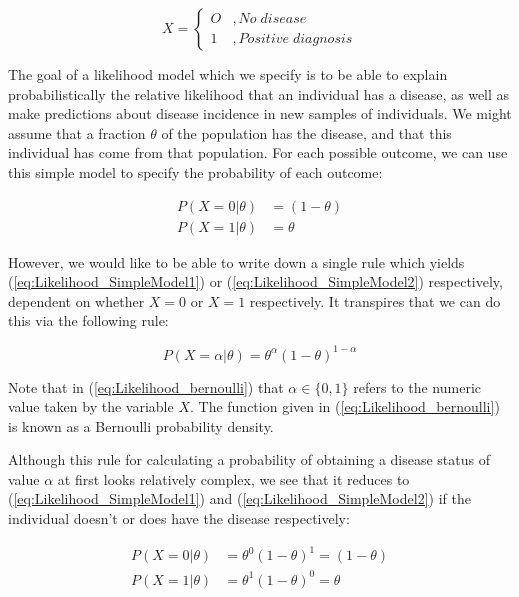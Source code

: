 \documentclass[11pt,fullpage]{book}
\begin{document}
\begin{equation}
X =
\begin{cases}
O & , No\; disease \\
1 & , Positive \; diagnosis
\end{cases}
\end{equation}

The goal of a likelihood model which we specify is to be able to explain probabilistically the relative likelihood that an individual has a disease, as well as make predictions about disease incidence in new samples of individuals. We might assume that a fraction $\theta$ of the population has the disease, and that this individual has come from that population. For each possible outcome, we can use this simple model to specify the probability of each outcome:

\begin{align}\label{eq:Likelihood_SimpleModel1}
P(X = 0|\theta)& = (1-\theta)\\
P(X = 1|\theta)& = \theta\label{eq:Likelihood_SimpleModel2}
\end{align}

However, we would like to be able to write down a single rule which yields (\ref{eq:Likelihood_SimpleModel1}) or (\ref{eq:Likelihood_SimpleModel2}) respectively, dependent on whether $X=0$ or $X=1$ respectively. It transpires that we can do this via the following rule:

\begin{equation}
P(X=\alpha|\theta) = \theta^\alpha(1-\theta)^{1-\alpha}
\end{equation}\label{eq:Likelihood_bernoulli}

Note that in (\ref{eq:Likelihood_bernoulli}) that $\alpha\in\{0,1\}$ refers to the numeric value taken by the variable $X$. The function given in (\ref{eq:Likelihood_bernoulli}) is known as a Bernoulli probability density.

Although this rule for calculating a probability of obtaining a disease status of value $\alpha$ at first looks relatively complex, we see that it reduces to (\ref{eq:Likelihood_SimpleModel1}) and (\ref{eq:Likelihood_SimpleModel2}) if the individual doesn't or does have the disease respectively:

\begin{align}\label{eq:Likelihood_SimpleModel3}
P(X = 0|\theta)& = \theta^0(1-\theta)^1 = (1-\theta)\\
P(X = 1|\theta)& = \theta^1(1-\theta)^0 = \theta\label{eq:Likelihood_SimpleModel4}
\end{align}
\end{document}
